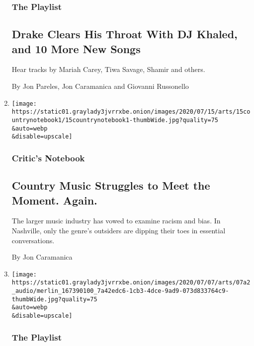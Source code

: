 \begin{enumerate}
  \hypertarget{the-playlist-2}{%
  \subsubsection{The Playlist}\label{the-playlist-2}}

  \hypertarget{drake-clears-his-throat-with-dj-khaled-and-10-more-new-songs}{%
  \subsection{Drake Clears His Throat With DJ Khaled, and 10 More New
  Songs}\label{drake-clears-his-throat-with-dj-khaled-and-10-more-new-songs}}

  Hear tracks by Mariah Carey, Tiwa Savage, Shamir and others.

  By Jon Pareles, Jon Caramanica and Giovanni Russonello
\item
  \href{/2020/07/15/arts/music/country-music-race.html}{}

  \texttt{[image: https://static01.graylady3jvrrxbe.onion/images/2020/07/15/arts/15countrynotebook1/15countrynotebook1-thumbWide.jpg?quality=75\\\&auto=webp\\\&disable=upscale]}

  \hypertarget{critics-notebook-1}{%
  \subsubsection{Critic's Notebook}\label{critics-notebook-1}}

  \hypertarget{country-music-struggles-to-meet-the-moment-again}{%
  \subsection{Country Music Struggles to Meet the Moment.
  Again.}\label{country-music-struggles-to-meet-the-moment-again}}

  The larger music industry has vowed to examine racism and bias. In
  Nashville, only the genre's outsiders are dipping their toes in
  essential conversations.

  By Jon Caramanica
\item
  \href{/2020/07/03/arts/music/playlist-kanye-west-ty-dolla-sign-blackpink.html}{}

  \texttt{[image: https://static01.graylady3jvrrxbe.onion/images/2020/07/07/arts/07a2\_audio/merlin\_167390100\_7a42edc6-1cb3-4dce-9ad9-073d833764c9-thumbWide.jpg?quality=75\\\&auto=webp\\\&disable=upscale]}

  \hypertarget{the-playlist-3}{%
  \subsubsection{The Playlist}\label{the-playlist-3}}


\end{enumerate}
